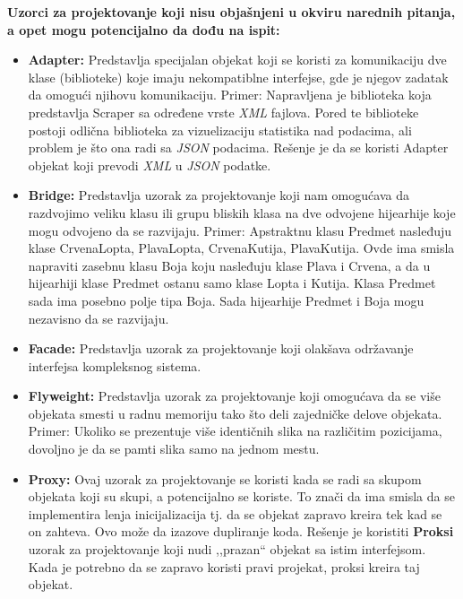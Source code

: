 \documentclass[a4paper]{article}
\begin{document}
  \textbf{Uzorci za projektovanje koji nisu objašnjeni u okviru narednih pitanja, a opet mogu potencijalno da
          dođu na ispit:}
  \begin{itemize}
    \item \textbf{Adapter:} Predstavlja specijalan objekat koji se koristi za komunikaciju dve klase (biblioteke) koje 
          imaju nekompatiblne interfejse, gde je njegov zadatak da omogući njihovu komunikaciju. Primer: Napravljena
          je biblioteka koja predstavlja Scraper sa određene vrste \textit{XML} fajlova. Pored te biblioteke 
          postoji odlična biblioteka za vizuelizaciju statistika nad podacima, ali problem je što ona radi sa 
          \textit{JSON} podacima. Rešenje je da se koristi Adapter objekat koji prevodi \textit{XML} u \textit{JSON}
          podatke.
    \item \textbf{Bridge:} Predstavlja uzorak za projektovanje koji nam omogućava da razdvojimo veliku klasu
          ili grupu bliskih klasa na dve odvojene hijearhije koje mogu odvojeno da se razvijaju. Primer:
          Apstraktnu klasu Predmet nasleđuju klase CrvenaLopta, PlavaLopta, CrvenaKutija, PlavaKutija. Ovde ima 
          smisla napraviti zasebnu klasu Boja koju nasleđuju klase Plava i Crvena, a da u hijearhiji klase Predmet
          ostanu samo klase Lopta i Kutija. Klasa Predmet sada ima posebno polje tipa Boja. Sada hijearhije 
          Predmet i Boja mogu nezavisno da se razvijaju.
    \item \textbf{Facade:} Predstavlja uzorak za projektovanje koji olakšava održavanje interfejsa kompleksnog sistema.
    \item \textbf{Flyweight:} Predstavlja uzorak za projektovanje koji omogućava da se više objekata smesti u radnu 
          memoriju tako što deli zajedničke delove objekata. Primer: Ukoliko se prezentuje više identičnih slika
          na različitim pozicijama, dovoljno je da se pamti slika samo na jednom mestu.
    \item \textbf{Proxy:} Ovaj uzorak za projektovanje se koristi kada se radi sa skupom objekata koji su skupi,
          a potencijalno se koriste. To znači da ima smisla da se implementira lenja inicijalizacija tj. 
          da se objekat zapravo kreira tek kad se on zahteva. Ovo može da izazove dupliranje koda. Rešenje je 
          koristiti \textbf{Proksi} uzorak za projektovanje koji nudi ,,prazan`` objekat sa istim interfejsom.
          Kada je potrebno da se zapravo koristi pravi projekat, proksi kreira taj objekat.
  \end{itemize}
\end{document}
